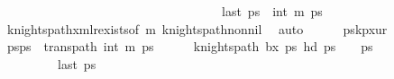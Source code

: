 \begin{isabellebody}
\ \ \ \ \ \ \ \ \ \ \ \ \ \ \ \ \ \ \ \ \ \ \ \ \ \ \ \ \ \ \ \ \ \ \ {\isachardoublequoteopen}last\ ps\ {\isacharequal}{\kern0pt}\ {\isacharparenleft}{\kern0pt}{}{\isacharcomma}{\kern0pt}int\ {\isacharparenleft}{\kern0pt}m{\isacharminus}{\kern0pt}{}{\isacharparenright}{\kern0pt}{\isacharminus}{\kern0pt}{}{\isacharparenright}{\kern0pt}{\isachardoublequoteclose}\ {\isachardoublequoteopen}ps\ {\isasymnoteq}\ {\isacharbrackleft}{\kern0pt}{\isacharbrackright}{\kern0pt}{\isachardoublequoteclose}\isanewline
\ \ \ \ \ \ \isamarkupfalse%
\ knights{\isacharunderscore}{\kern0pt}path{\isacharunderscore}{\kern0pt}{}xm{\isacharunderscore}{\kern0pt}lr{\isacharunderscore}{\kern0pt}exists{\isacharbrackleft}{\kern0pt}of\ {\isachardoublequoteopen}{\isacharparenleft}{\kern0pt}m{\isacharminus}{\kern0pt}{}{\isacharparenright}{\kern0pt}{\isachardoublequoteclose}{\isacharbrackright}{\kern0pt}\ knights{\isacharunderscore}{\kern0pt}path{\isacharunderscore}{\kern0pt}non{\isacharunderscore}{\kern0pt}nil\ \isamarkupfalse%
\ auto\isanewline
\ \ \ \ \isamarkupfalse%
\ {\isacharquery}{\kern0pt}pskp{}x{}ur{\isachardoublequoteclose}\isanewline
\ \ \ \ \isamarkupfalse%
\ {\isacharquery}{\kern0pt}ps{\isacharprime}{\kern0pt}{\isacharequal}{\kern0pt}{\isachardoublequoteopen}ps\ {\isacharat}{\kern0pt}\ trans{\isacharunderscore}{\kern0pt}path\ {\isacharparenleft}{\kern0pt}{}{\isacharcomma}{\kern0pt}int\ {\isacharparenleft}{\kern0pt}m{\isacharminus}{\kern0pt}{}{\isacharparenright}{\kern0pt}{\isacharparenright}{\kern0pt}\ {\isacharquery}{\kern0pt}ps\isanewline
\ \ \ \ \isamarkupfalse%
\ {\isachardoublequoteopen}knights{\isacharunderscore}{\kern0pt}path\ b{}x{}\ {\isacharquery}{\kern0pt}ps\ {\isachardoublequoteopen}hd\ {\isacharquery}{\kern0pt}ps\ {\isacharequal}{\kern0pt}\ {\isacharparenleft}{\kern0pt}{}{\isacharcomma}{\kern0pt}\ {}{\isacharparenright}{\kern0pt}{\isachardoublequoteclose}\ {\isachardoublequoteopen}{\isacharquery}{\kern0pt}ps\ {\isasymnoteq}\ {\isacharbrackleft}{\kern0pt}{\isacharbrackright}{\kern0pt}{\isachardoublequoteclose}\ \isanewline
\ \ \ \ \ \ \ \ \ {\isachardoublequoteopen}last\ {\isacharquery}{\kern0pt}ps\ {\isacharequal}{\kern0pt}\ {\isacharparenleft}{\kern0pt}{}{\isacharcomma}{\kern0pt}{}{\isacharparenright}{\kern0pt}{\isachardoublequoteclose}\isanewline

\end{isabellebody}
